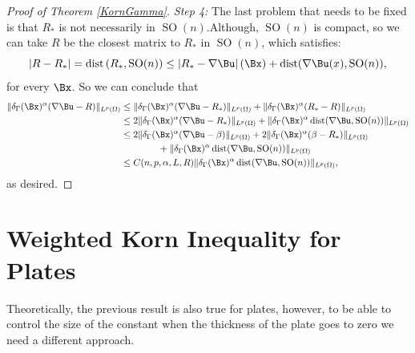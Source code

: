 \begin{proof}[Proof of Theorem \ref{KornGamma}]
\textit{Step 4:} The last problem that needs to be fixed is that $R_*$ is not necessarily in $\operatorname{SO}(n)$.Although,  $\operatorname{SO}(n)$ is compact, so we can take  $R$ be the closest matrix to $R_*$ in $\operatorname{SO}(n)$, which satisfies:
$$\left|R-R_*\right|=\operatorname{dist}\left(R_*, \mathrm{SO}(n)\right) \leq\left|R_*-\nabla \Bu\right|(\Bx)+\operatorname{dist}(\nabla \Bu(x), \mathrm{SO}(n)),$$
for every $\Bx$. So we can conclude that
\begin{align*}
\|\delta_\GG(\Bx)^\alpha(\nabla \Bu-R)\|_{L^p(\Omega)}&\leq \|\delta_\GG(\Bx)^\alpha(\nabla \Bu-R_*)\|_{L^p(\Omega)}+\|\delta_\GG(\Bx)^\alpha(R_*-R)\|_{L^p(\Omega)}\\
&\leq 2\|\delta_\GG(\Bx)^\alpha(\nabla \Bu-R_*)\|_{L^p(\Omega)} +\|\delta_\GG(\Bx)^\alpha \operatorname{dist}(\nabla \Bu, \mathrm{SO}(n))\|_{L^p(\Omega)}\\
&\leq 2\|\delta_\GG(\Bx)^\alpha(\nabla \Bu-\beta)\|_{L^p(\Omega)} + 2\|\delta_\GG(\Bx)^\alpha(\beta-R_*)\|_{L^p(\Omega)}\\
&\qquad\qquad +\|\delta_\GG(\Bx)^\alpha \operatorname{dist}(\nabla \Bu, \mathrm{SO}(n))\|_{L^p(\Omega)}\\ 
&\leq C(n,p,\alpha,L,R) \|\delta_\GG(\Bx)^\alpha \operatorname{dist}(\nabla \Bu, \mathrm{SO}(n))\|_{L^p(\Omega)},
\end{align*}
as desired.

\end{proof}

\section{Weighted Korn Inequality for Plates}
\label{sec:plateWKorn}

Theoretically, the previous result is also true for plates, however, to be able to control the size of the constant when the thickness of the plate goes to zero we need a different approach.

